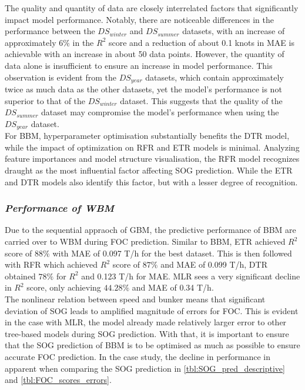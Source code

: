 The quality and quantity of data are closely interrelated factors that significantly impact model performance. Notably, there are noticeable differences in the performance between the $DS_{winter}$ and $DS_{summer}$ datasets, with an increase of approximately $6\%$ in the $R^2$ score and a reduction of about 0.1 knots in MAE is achievable with an increase in about 50 data points. However, the quantity of data alone is insufficient to ensure an increase in model performance. This observation is evident from the $DS_{year}$ datasets, which contain approximately twice as much data as the other datasets, yet the model's performance is not superior to that of the $DS_{winter}$ dataset. This suggests that the quality of the $DS_{summer}$ dataset may compromise the model's performance when using the $DS_{year}$ dataset.\\

For BBM, hyperparameter optimisation substantially benefits the DTR model, while the impact of optimization on RFR and ETR models is minimal. Analyzing feature importances and model structure visualisation, the RFR model recognizes draught as the most influential factor affecting SOG prediction. While the ETR and DTR models also identify this factor, but with a lesser degree of recognition.\\


\subsubsection*{\emph{Performance of WBM}}

Due to the sequential appraoch of GBM, the predictive performance of BBM are carried over to WBM during FOC prediction. Similar to BBM, ETR achieved $R^2$ score of $88\%$ with MAE of 0.097 T/h for the best dataset. This is then followed with RFR which achieved $R^2$ score of $87\%$ and MAE of 0.099 T/h, DTR obtained $78\%$ for $R^2$ and 0.123 T/h for MAE. MLR sees a very significant decline in $R^2$ score, only achieving $44.28\%$ and MAE of 0.34 T/h.\\

The nonlinear relation between speed and bunker means that significant deviation of SOG leads to amplified magnitude of errors for FOC. This is evident in the case with MLR, the model already made relatively larger error to other tree-based models during SOG prediction. With that, it is important to ensure that the SOG prediction of BBM is to be optimised as much as possible to ensure accurate FOC prediction. In the case study, the decline in performance in apparent when comparing the SOG prediction in \cref{tbl:SOG_pred_descriptive} and \cref{tbl:FOC_scores_errors}.\\

